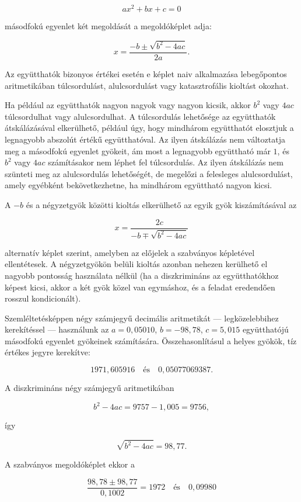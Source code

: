 \documentclass[
  magyar,
  11pt]{article}
\begin{document}
\[ax^2 + bx + c = 0\]

másodfokú egyenlet két megoldását a megoldóképlet adja:

\[x = \frac{-b \pm \sqrt{b^2 - 4ac}}{2a}.\]

Az együtthatók bizonyos értékei esetén e képlet naiv alkalmazása
lebegőpontos aritmetikában túlcsordulást, alulcsordulást vagy
katasztrofális kioltást okozhat.

Ha például az együtthatók nagyon nagyok vagy nagyon kicsik, akkor
\(b^2\) vagy \(4ac\) túlcsordulhat vagy alulcsordulhat. A túlcsordulás
lehetősége az együtthatók átskálázásával elkerülhető, például úgy, hogy
mindhárom együtthatót elosztjuk a legnagyobb abszolút értékű
együtthatóval. Az ilyen átskálázás nem változtatja meg a másodfokú
egyenlet gyökeit, ám most a legnagyobb együttható már \(1\), és \(b^2\)
vagy \(4ac\) számításakor nem léphet fel túlcsordulás. Az ilyen
átskálázás nem szünteti meg az alulcsordulás lehetőségét, de megelőzi a
felesleges alulcsordulást, amely egyébként bekövetkezhetne, ha mindhárom
együttható nagyon kicsi.

A \(-b\) és a négyzetgyök közötti kioltás elkerülhető az egyik gyök
kiszámításával az

\[x = \frac{2c}{-b \mp \sqrt{b^2 - 4ac}}\]

alternatív képlet szerint, amelyben az előjelek a szabványos képletével
ellentétesek. A négyzetgyökön belüli kioltás azonban nehezen kerülhető
el nagyobb pontosság használata nélkül (ha a diszkrimináns az
együtthatókhoz képest kicsi, akkor a két gyök közel van egymáshoz, és a
feladat eredendően rosszul kondicionált).

Szemléltetésképpen négy számjegyű decimális aritmetikát ---
legközelebbihez kerekítéssel --- használunk az \(a = 0{,}05010\),
\(b = -98{,}78\), \(c = 5{,}015\) együtthatójú másodfokú egyenlet
gyökeinek számítására. Összehasonlításul a helyes gyökök, tíz értékes
jegyre kerekítve:

\[1971{,}605916 \quad \text{és} \quad 0{,}05077069387.\]

A diszkrimináns négy számjegyű aritmetikában

\[b^2 - 4ac = 9757 - 1{,}005 = 9756,\]

így

\[\sqrt{b^2 - 4ac} = 98{,}77.\]

A szabványos megoldóképlet ekkor a

\[\frac{98{,}78 \pm 98{,}77}{0{,}1002} = 1972 \quad \text{és} \quad 0{,}09980\]
\end{document}
